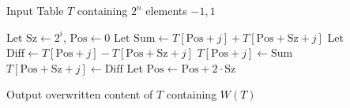 \documentclass[12pt,journal=tosc, notanonymous]{iacrtrans}
\newcommand{\homework}[1]{{\color{red}{#1}}}
\begin{document}


\begin{algorithm}[H]
\caption{Walsh transform algorithm}
\label{alg:walsh_transform}
\begin{algorithmic}[1] %
    \REQUIRE Input Table $T$ containing $2^n$ elements $-1, 1$

        \STATE Let $\text{Sz} \leftarrow 2^i$, $\text{Pos} \leftarrow 0$
                \STATE Let $\text{Sum} \leftarrow T[\text{Pos} + j] + T[\text{Pos} + \text{Sz} + j]$
                \STATE Let $\text{Diff} \leftarrow T[\text{Pos} + j] - T[\text{Pos} + \text{Sz} + j]$
                \STATE $T[\text{Pos} + j] \leftarrow \text{Sum}$
                \STATE $T[\text{Pos} + \text{Sz} + j] \leftarrow \text{Diff}$
            \ENDFOR
            \STATE Let $\text{Pos} \leftarrow \text{Pos} + 2 \cdot \text{Sz}$
        \ENDWHILE
    \ENDFOR

    \STATE Output overwritten content of $T$ containing $W(T)$
\end{algorithmic}
\end{algorithm}



\homework{Homework: Implement this algorithm.}
\end{document}
